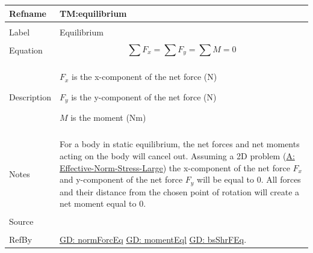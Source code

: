 \documentclass[12pt]{article}
\begin{document}
 \noindent \begin{minipage}{\textwidth}
\begin{tabular}{p{} p{}}
\toprule \textbf{Refname} & \textbf{TM:equilibrium}
\label{TM:equilibrium}
\\ \midrule \\
Label & Equilibrium
        \\ \midrule \\
        Equation & \begin{dmath}
                   \displaystyle\sum{{F_{x}}}=\displaystyle\sum{{F_{y}}}=\displaystyle\sum{M}=0
                   \end{dmath}
                   \\ \midrule \\
                   Description & \begin{symbDescription}
                                 \item{${F_{x}}$ is the x-component of the net force (N)}
                                 \item{${F_{y}}$ is the y-component of the net force (N)}
                                 \item{$M$ is the moment (Nm)}
                                 \end{symbDescription}
                                 \\ \midrule \\
                                 Notes & For a body in static equilibrium, the net forces and net moments acting on the body will cancel out. Assuming a 2D problem (\hyperref[A:Effective-Norm-Stress-Large]{A: Effective-Norm-Stress-Large}) the x-component of the net force ${F_{x}}$ and y-component of the net force ${F_{y}}$ will be equal to $0$. All forces and their distance from the chosen point of rotation will create a net moment equal to $0$.
                                         \\ \midrule \\
                                         Source & \cite{fredlund1977}
                                                  \\ \midrule \\
                                                  RefBy & \hyperref[GD:normForcEq]{GD: normForcEq} \hyperref[GD:momentEql]{GD: momentEql} \hyperref[GD:bsShrFEq]{GD: bsShrFEq}.
\\ \bottomrule \end{tabular}
\end{minipage}\\
\end{document}
